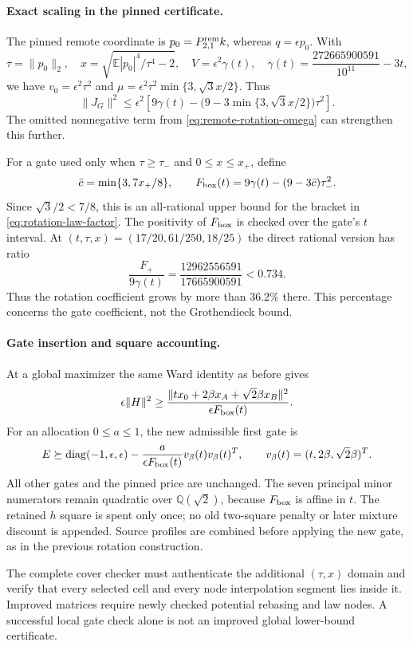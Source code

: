 \paragraph{Exact scaling in the pinned certificate.}
The pinned remote coordinate is $p_0=P_{2,1}^{\rm rem}k$, whereas
$q=\epsilon p_0$. With
\[
 \tau=\|p_0\|_2,\quad
 x=\sqrt{\mathbb E|p_0|^4/\tau^4-2},\quad
 V=\epsilon^2\gamma(t),\quad
 \gamma(t)=\frac{272665900591}{10^{11}}-3t,
\]
we have $v_0=\epsilon^2\tau^2$ and
$\mu=\epsilon^2\tau^2\min\{3,\sqrt3x/2\}$. Thus
\begin{equation}\label{eq:rotation-law-factor}
 \|J_G\|^2\le\epsilon^2
 \left[9\gamma(t)-\bigl(9-3\min\{3,\sqrt3x/2\}\bigr)\tau^2\right].
\end{equation}
The omitted nonnegative term from
\eqref{eq:remote-rotation-omega} can strengthen this further.

For a gate used only when $\tau\ge\tau_-$ and $0\le x\le x_+$, define
\[
 \bar c=\min\{3,7x_+/8\},\qquad
 F_{\rm box}(t)=9\gamma(t)-(9-3\bar c)\tau_-^2.
\]
Since $\sqrt3/2<7/8$, this is an all-rational upper bound for the
bracket in \eqref{eq:rotation-law-factor}. The positivity of
$F_{\rm box}$ is checked over the gate's $t$ interval. At
$(t,\tau,x)=(17/20,61/250,18/25)$ the direct rational version has ratio
\[
 \frac{F_+}{9\gamma(t)}=
 \frac{12962556591}{17665900591}<0.734.
\]
Thus the rotation coefficient grows by more than $36.2\%$ there.
This percentage concerns the gate coefficient, not the Grothendieck bound.

\paragraph{Gate insertion and square accounting.}
At a global maximizer the same Ward identity as before gives
\[
 \epsilon\|H\|^2\ge
 \frac{\|t x_0+2\beta x_A+\sqrt2\beta x_B\|^2}
      {\epsilon F_{\rm box}(t)}.
\]
For an allocation $0\le a\le1$, the new admissible first gate is
\[
 E\succeq\operatorname{diag}(-1,\epsilon,\epsilon)
 -\frac{a}{\epsilon F_{\rm box}(t)}
 v_\beta(t)v_\beta(t)^T,
 \qquad v_\beta(t)=(t,2\beta,\sqrt2\beta)^T.
\]
All other gates and the pinned price are unchanged. The seven principal
minor numerators remain quadratic over $\mathbb Q(\sqrt2)$, because
$F_{\rm box}$ is affine in $t$. The retained $h$ square is spent only
once; no old two-square penalty or later mixture discount is appended.
Source profiles are combined before applying the new gate, as in the
previous rotation construction.

The complete cover checker must authenticate the additional
$(\tau,x)$ domain and verify that every selected cell and every node
interpolation segment lies inside it. Improved matrices require newly
checked potential rebasing and law nodes. A successful local gate check
alone is not an improved global lower-bound certificate.

